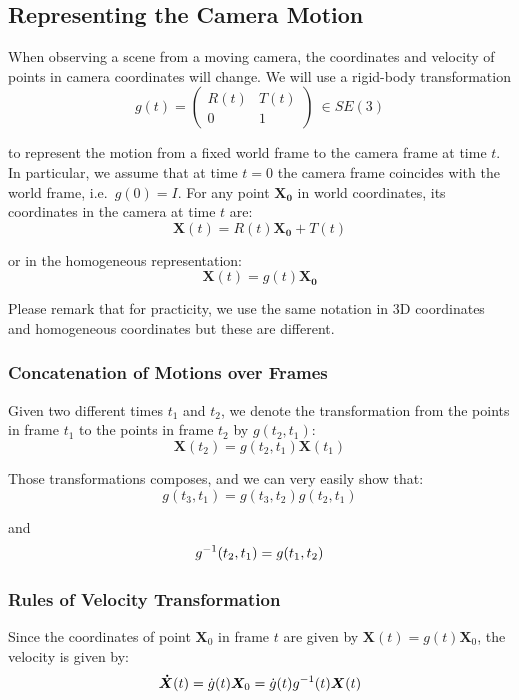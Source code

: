 \subsection{Representing the Camera Motion}%
\label{sub:representing_the_camera_motion}

When observing a scene from a moving camera, the coordinates and velocity
of points in camera coordinates will change. We will use a rigid-body transformation
	\[g(t) = \begin{pmatrix}
		R(t) & T(t) \\
		0 & 1
	\end{pmatrix}\ \in SE(3)\]

to represent the motion from a fixed world frame to the camera frame at time $t$.
In particular, we assume that at time $t=0$ the camera frame coincides with the
world frame, i.e.\ $g(0)=I$.
For any point $\bm{X_0}$ in world coordinates,
its coordinates in the camera at time $t$ are:
	\[\bm{X}(t) = R(t)\bm{X_0} + T(t)\]

or in the homogeneous representation:
	\[\bm{X}(t) = g(t)\bm{X_0}\]

Please remark that for practicity, we use the same notation
in 3D coordinates and homogeneous coordinates but these are different.


\subsubsection{Concatenation of Motions over Frames}%
\label{ssub:concatenation_of_motions_over_frames}

Given two different times $t_1$ and $t_2$, we denote the transformation from
the points in frame $t_1$ to the points in frame $t_2$ by $g(t_2,t_1)$:
	\[\bm{X}(t_2) = g(t_2,t_1) \bm{X}(t_1)\]

Those transformations composes, and we can very easily show that:
	\[g(t_3,t_1) = g(t_3,t_2) g(t_2,t_1)\]

and
	\[g^{-1}(t_2,t_1) = g(t_1,t_2)\]


\subsubsection{Rules of Velocity Transformation}%
\label{ssub:rules_of_velocity_transformation}

Since the coordinates of point $\bm{X}_0$ in frame $t$ are given by
$\bm{X}(t) = g(t) \bm{X}_0$, the velocity is given by:
	\[\bm{\dot{X}}(t) = \dot{g}(t)\bm{X}_0 = \dot{g}(t)g^{-1}(t) \bm{X}(t)\]

